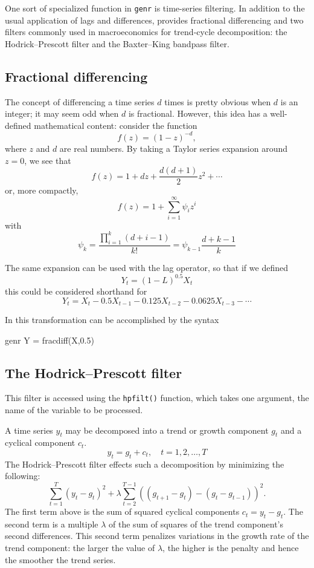 One sort of specialized function in \verb+genr+ is time-series
filtering. In addition to the usual application of lags and
differences,  provides fractional differencing and two
filters commonly used in macroeconomics for trend-cycle decomposition:
the Hodrick--Prescott filter and the Baxter--King bandpass filter.

\subsection{Fractional differencing}
\label{sec:fracdiff}

The concept of differencing a time series $d$ times is pretty obvious
when $d$ is an integer; it may seem odd when $d$ is
fractional. However, this idea has a well-defined
mathematical content: consider the function
\[
  f(z) = (1 - z)^{-d},
\]
where $z$ and $d$ are real numbers. By taking a Taylor series
expansion around $z=0$, we see that
\[
  f(z) = 1 + dz + \frac{d (d+1)}{2} z^2 + \cdots 
\]
or, more compactly,
\[
  f(z) = 1 + \sum_{i=1}^{\infty} \psi_i z^i
\]
with
\[
  \psi_k = \frac{\prod_{i=1}^{k} (d+i-1) }{k!} = \psi_{k-1} \frac{d+k-1}{k}
\]

The same expansion can be used with the lag operator, so that if we defined
\[
  Y_t = (1-L)^{0.5} X_t
\]
this could be considered shorthand for
\[
Y_t = X_t - 0.5 X_{t-1} - 0.125 X_{t-2} - 0.0625 X_{t-3} - \cdots 
\]
    
In  this transformation can be accomplished by the syntax 
\begin{code}
genr Y = fracdiff(X,0.5)
\end{code}

\subsection{The Hodrick--Prescott filter}
\label{hodrick-prescott}

This filter is accessed using the \verb+hpfilt()+ function, which
takes one argument, the name of the variable to be processed.

A time series $y_t$ may be decomposed into a trend or growth
component $g_t$ and a cyclical component $c_t$.  
%
\[
y_t = g_t + c_t, \quad t = 1,2,\dots,T
\]
%
The Hodrick--Prescott filter effects such a decomposition by
minimizing the following:
%
\[
    \sum_{t = 1}^T {(y_t - g_t )^2 } + \lambda \sum_{t = 2}^{T -
      1} \left((g_{t+1} - g_t) - (g_t - g_{t - 1} )\right)^2 .
\]
%
The first term above is the sum of squared cyclical components $c_t =
y_t - g_t$. The second term is a multiple $\lambda$ of the sum of
squares of the trend component's second differences. This
second term penalizes variations in the growth rate of the trend
component: the larger the value of $\lambda$, the higher is the
penalty and hence the smoother the trend series.

